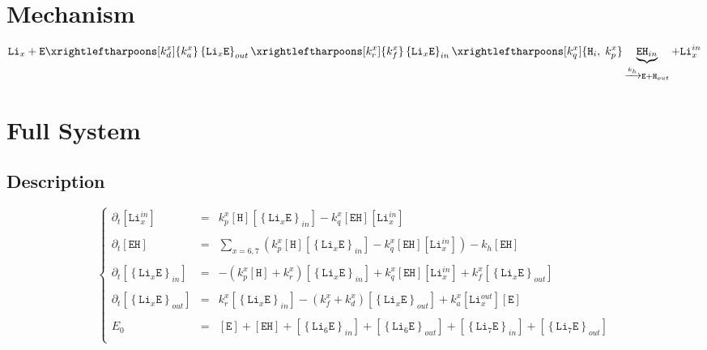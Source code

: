 \documentclass[aps,onecolumn,11pt]{revtex4}
\newcommand{\mychem}[1]{\mathtt{#1}}
\newcommand{\myconc}[1]{\left\lbrack{#1}\right\rbrack}
\newcommand{\LiEin}[1]{\myconc{\left\lbrace\mychem{Li}_{#1}\mychem{E}\right\rbrace_{in}}}
\newcommand{\LiEout}[1]{\myconc{\left\lbrace\mychem{Li}_{#1}\mychem{E}\right\rbrace_{out}}}
\newcommand{\LiIn}[1]{\myconc{\mychem{Li}_{#1}^{in}}}
\newcommand{\LiOut}[1]{\myconc{\mychem{Li}_{#1}^{out}}}
\newcommand{\EHin}{\myconc{\mychem{EH}}}
\newcommand{\Eout}{\myconc{\mychem{E}}}
\newcommand{\Hin}{\myconc{\mychem{H}}}
\begin{document}
\section{Mechanism}
\begin{equation}
	 \mychem{Li}_{x} +  \mychem{E}  
	 \xrightleftharpoons[k_d^x]{k_a^x} 
	 \left\lbrace\mychem{Li}_{x}\mychem{E}\right\rbrace_{out} 
	  \xrightleftharpoons[k_r^x]{k_f^x} 
	  \left\lbrace\mychem{Li}_{x}\mychem{E}\right\rbrace_{in}  
	  \xrightleftharpoons[k_q^x]{\mychem{H}_i,\;k_p^x} \underbrace{\mychem{EH}_{in}}_{\xrightarrow[]{k_h} \mychem{E} + \mychem{H}_{out}} + \mychem{Li}_{x}^{in}
\end{equation}

\section{Full System}
\subsection{Description}
\begin{equation}
\displaystyle
\left\lbrace
\begin{array}{rcl}
\partial_t\LiIn{x}   & = & k_p^x \Hin \LiEin{x} - k_q^x \EHin \LiIn{x} \\
\\
\partial_t \EHin     & = & \sum_{x=6,7}\left( k_p^x \Hin \LiEin{x} - k_q^x \EHin \LiIn{x}\right) - k_h \EHin \\
\\
\partial_t \LiEin{x} & = & -\left(k_p^x \Hin + k_r^x\right) \LiEin{x} + k_q^x \EHin \LiIn{x}
+ k_f^x \LiEout{x} \\
\\
\partial_t \LiEout{x} & = & k_r^x \LiEin{x} - (k_f^x+k_d^x) \LiEout{x} + k_a^x \LiOut{x} \Eout \\
\\
E_0 & = & \Eout + \EHin + \LiEin{6} + \LiEout{6} + \LiEin{7}+\LiEout{7}\\
\end{array}
\right.
\end{equation}
\end{document}
